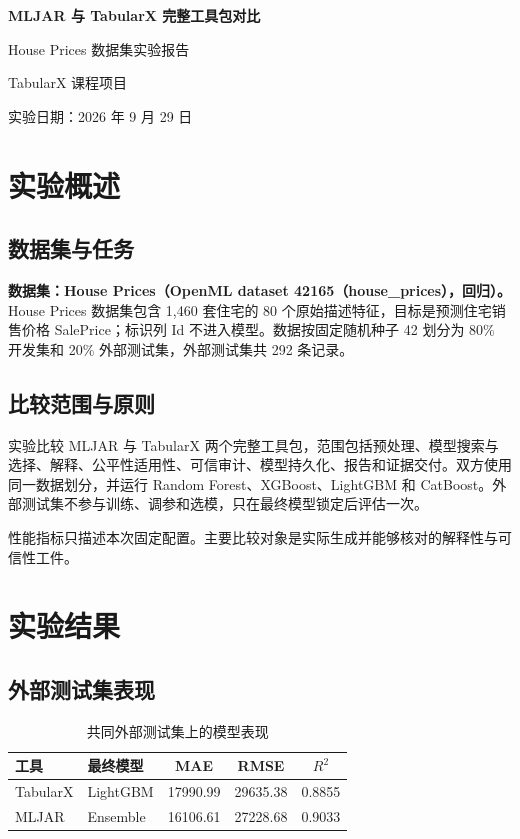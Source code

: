\documentclass[degree=bachelor,language=chinese,fontset=fandol]{thuthesis}
\begin{document}
\begin{titlepage}
  \centering
  \vspace*{2.3cm}
  {\bfseries MLJAR 与 TabularX 完整工具包对比\par}
  \vspace{1.2cm}
  {House Prices 数据集实验报告\par}
  \vspace{2.2cm}
  {TabularX 课程项目\par}
  \vfill
  {实验日期：2026 年 9 月 29 日\par}
  \vspace{1.2cm}
\end{titlepage}

\frontmatter
\tableofcontents
\mainmatter
\chapter{实验概述}
\section{数据集与任务}
\textbf{数据集：House Prices（OpenML dataset 42165（house\_prices），回归）。}
House Prices 数据集包含 1,460 套住宅的 80 个原始描述特征，目标是预测住宅销售价格 SalePrice；标识列 Id 不进入模型。数据按固定随机种子 42 划分为 80\% 开发集和 20\% 外部测试集，外部测试集共 292 条记录。

\section{比较范围与原则}
实验比较 MLJAR 与 TabularX 两个完整工具包，范围包括预处理、模型搜索与选择、解释、公平性适用性、可信审计、模型持久化、报告和证据交付。双方使用同一数据划分，并运行 Random Forest、XGBoost、LightGBM 和 CatBoost。外部测试集不参与训练、调参和选模，只在最终模型锁定后评估一次。

性能指标只描述本次固定配置。主要比较对象是实际生成并能够核对的解释性与可信性工件。

\chapter{实验结果}
\section{外部测试集表现}
\begin{table}[htbp]
  \centering
  \small
  \caption{共同外部测试集上的模型表现}
  \begin{tabular}{llccc}
    \toprule
    工具 & 最终模型 & MAE & RMSE & $R^2$ \\
    \midrule
    TabularX & LightGBM & 17990.99 & 29635.38 & 0.8855 \\
    MLJAR & Ensemble & 16106.61 & 27228.68 & 0.9033 \\
    \bottomrule
  \end{tabular}
\end{table}
\end{document}
